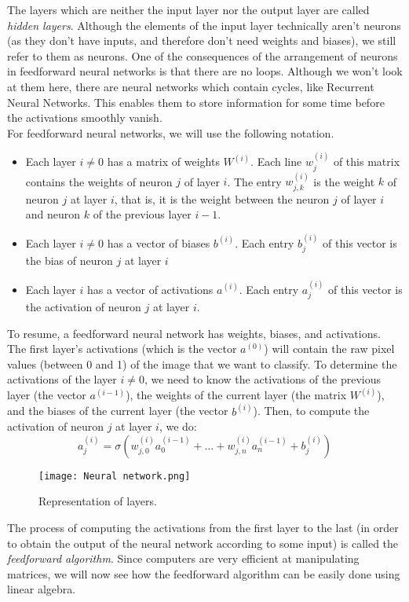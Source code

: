 \documentclass{article}
\theoremstyle{definition}
\theoremstyle{remark}
\theoremstyle{example}
\begin{document}
The layers which are neither the input layer nor the output layer are called \textit{hidden layers}. Although the elements of the input layer technically aren't neurons (as they don't have inputs, and therefore don't need weights and biases), we still refer to them as neurons. One of the consequences of the arrangement of neurons in feedforward neural networks is that there are no loops. Although we won't look at them here, there are neural networks which contain cycles, like Recurrent Neural Networks. This enables them to store information for some time before the activations smoothly vanish.\\

For feedforward neural networks, we will use the following notation.
\begin{itemize}
    \item Each layer $i \neq 0$ has a matrix of weights $W^{(i)}$. Each line $w^{(i)}_j$ of this matrix contains the weights of neuron $j$ of layer $i$. The entry $w^{(i)}_{j,k}$ is the weight $k$ of neuron $j$ at layer $i$, that is, it is the weight between the neuron $j$ of layer $i$ and neuron $k$ of the previous layer $i-1$.
    \item Each layer $i \neq 0$ has a vector of biases $b^{(i)}$. Each entry $b^{(i)}_j$ of this vector is the bias of neuron $j$ at layer $i$
    \item Each layer $i$ has a vector of activations $a^{(i)}$. Each entry $a^{(i)}_j$ of this vector is the activation of neuron $j$ at layer $i$.
\end{itemize}

To resume, a feedforward neural network has weights, biases, and activations. The first layer's activations (which is the vector $a^{(0)}$) will contain the raw pixel values (between 0 and 1) of the image that we want to classify. To determine the activations of the layer $i \neq 0$, we need to know the activations of the previous layer (the vector $a^{(i-1)}$), the weights of the current layer (the matrix $W^{(i)}$), and the biases of the current layer (the vector $b^{(i)}$). Then, to compute the activation of neuron $j$ at layer $i$, we do:
    $$a^{(i)}_j = \sigma(w^{(i)}_{j,0} a^{(i-1)}_0 + \dots + w^{(i)}_{j,n} a^{(i-1)}_n + b^{(i)}_j)$$

\begin{figure}[!h]
    \centering
    \texttt{[image: Neural network.png]}
    \caption{Representation of layers.}
\end{figure}

The process of computing the activations from the first layer to the last (in order to obtain the output of the neural network according to some input) is called the \textit{feedforward algorithm}. Since computers are very efficient at manipulating matrices, we will now see how the feedforward algorithm can be easily done using linear algebra.
\end{document}
